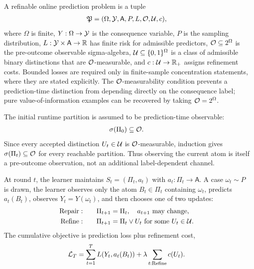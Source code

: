 \begin{definition}
\label{def:refinable-online-prediction}
A refinable online prediction problem is a tuple
\begin{align*}
\mathfrak P=(\Omega,\mathcal{Y},\mathsf A,P,L,\mathcal{O},\mathcal{U},c),
\end{align*}
where $\Omega$ is finite, $Y:\Omega\to\mathcal{Y}$ is the consequence variable, $P$ is the sampling distribution, $L:\mathcal{Y}\times\mathsf A\to\mathbb{R}$ has finite risk for admissible predictors, $\mathcal{O}\subseteq2^\Omega$ is the pre-outcome observable sigma-algebra, $\mathcal{U}\subseteq\{0,1\}^{\Omega}$ is a class of admissible binary distinctions that are $\mathcal{O}$-measurable, and $c:\mathcal{U}\to\mathbb{R}_+$ assigns refinement costs. Bounded losses are required only in finite-sample concentration statements, where they are stated explicitly. The $\mathcal{O}$-measurability condition prevents a prediction-time distinction from depending directly on the consequence label; pure value-of-information examples can be recovered by taking $\mathcal{O}=2^\Omega$.

The initial runtime partition is assumed to be prediction-time observable:
\begin{align*}
\sigma(\Pi_0)\subseteq \mathcal{O}.
\end{align*}
Since every accepted distinction $U_t\in\mathcal{U}$ is $\mathcal{O}$-measurable, induction gives $\sigma(\Pi_t)\subseteq\mathcal{O}$ for every reachable partition. Thus observing the current atom is itself a pre-outcome observation, not an additional label-dependent channel.

At round $t$, the learner maintains $S_t=(\Pi_t,a_t)$ with $a_t:\Pi_t\to\mathsf A$. A case $\omega_t\sim P$ is drawn, the learner observes only the atom $B_t\in\Pi_t$ containing $\omega_t$, predicts $a_t(B_t)$, observes $Y_t=Y(\omega_t)$, and then chooses one of two updates:
\begin{align*}
\mathrm{Repair}:&\qquad \Pi_{t+1}=\Pi_t,\quad a_{t+1}\text{ may change},\\
\mathrm{Refine}:&\qquad \Pi_{t+1}=\Pi_t\vee U_t\text{ for some }U_t\in\mathcal{U}.
\end{align*}
The cumulative objective is prediction loss plus refinement cost,
\begin{align*}
\mathcal{L}_T
=
\sum_{t=1}^T L(Y_t,a_t(B_t))
+
\lambda\sum_{t:\mathrm{Refine}}c(U_t).
\end{align*}
\end{definition}

